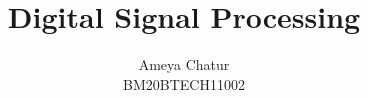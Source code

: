      \def\rightbox#1{\makebox[0in][r]{#1}}
     \def\centbox#1{\makebox[0in]{#1}}
     \def\topbox#1{\raisebox{-\baselineskip}[0in][0in]{#1}}
     \def\midbox#1{\raisebox{-0.5\baselineskip}[0in][0in]{#1}}
\vspace{3cm}
\title{ 
Digital Signal Processing 
}
%
%
%
\author{ Ameya Chatur \\BM20BTECH11002%
}
% 
%
